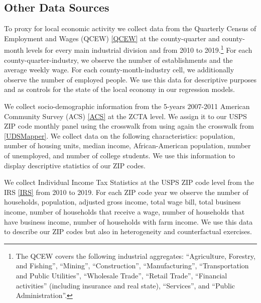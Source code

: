 \subsection{Other Data Sources}\label{sec:data/other_data}

To proxy for local economic activity we collect data from the Quarterly Census of 
Employment and Wages (QCEW) \ref{QCEW} at the county-quarter and county-month levels 
for every main industrial division and from 2010 to 2019.\footnote{The QCEW covers the 
	following industrial aggregates: 
	``Agriculture, Forestry, and Fishing'', ``Mining'', ``Construction'', ``Manufacturing'', 
	``Transportation and Public Utilities'', ``Wholesale Trade'', ``Retail Trade'',
	``Financial activities'' (including insurance and real state), ``Services'', and 
	``Public Administration''.}
For each county-quarter-industry, we observe the number of establishments and the 
average weekly wage. For each county-month-industry cell, we additionally observe the number 
of employed people. We use this data for descriptive purposes and as controls for the 
state of the local economy in our regression models. 

We collect socio-demographic information from the 5-years 2007-2011 American Community 
Survey (ACS) \ref{ACS} at the ZCTA level. We assign it to our USPS ZIP code monthly panel using
the crosswalk from using again the crosswalk from \ref{UDSMapper}.
We collect data on the following characteristics: population, number of housing units, 
median income, African-American population, number of unemployed, and number of college 
students. We use this information to display descriptive statistics of our ZIP codes.

We collect Individual Income Tax Statistics at the USPS ZIP code level from the IRS \ref{IRS} 
from 2010 to 2019. For each ZIP code year we observe the number of households, population,
adjusted gross income, total wage bill, total business income, number of households that receive 
a wage, number of households that have business income, number of households with farm income. 
We use this data to describe our ZIP codes but also in heterogeneity and counterfactual exercises.



